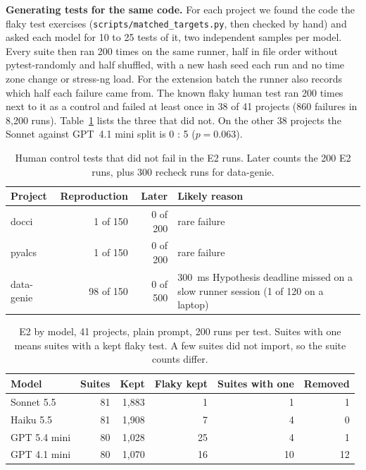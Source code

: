 \documentclass[sigconf,nonacm]{acmart}
\begin{document}
\textbf{Generating tests for the same code.} For each project we found the code the flaky test exercises (\texttt{scripts/matched\_targets.py}, then checked by hand) and asked each model for 10 to 25 tests of it, two independent samples per model. Every suite then ran 200 times on the same runner, half in file order without pytest-randomly and half shuffled, with a new hash seed each run and no time zone change or stress-ng load. For the extension batch the runner also records which half each failure came from. The known flaky human test ran 200 times next to it as a control and failed at least once in 38 of 41 projects (860 failures in 8,200 runs). Table~\ref{tab:control} lists the three that did not. On the other 38 projects the Sonnet against GPT~4.1 mini split is 0 : 5 ($p = 0.063$).

\begin{table}[h]
\caption{Human control tests that did not fail in the E2 runs. Later counts the 200 E2 runs, plus 300 recheck runs for data-genie.}
\label{tab:control}
\small
\setlength{\tabcolsep}{3pt}
\begin{tabularx}{\columnwidth}{lrrX}
\toprule
Project & Reproduction & Later & Likely reason \\
\midrule
docci & 1 of 150 & 0 of 200 & rare failure \\
pyalcs & 1 of 150 & 0 of 200 & rare failure \\
data-genie & 98 of 150 & 0 of 500 & 300~ms Hypothesis deadline missed on a slow runner session (1 of 120 on a laptop) \\
\bottomrule
\end{tabularx}
\end{table}

\begin{table}[h]
\caption{E2 by model, 41 projects, plain prompt, 200 runs per test. Suites with one means suites with a kept flaky test. A few suites did not import, so the suite counts differ.}
\label{tab:matched}
\small
\setlength{\tabcolsep}{4pt}
\begin{tabularx}{\columnwidth}{Xrrrrr}
\toprule
Model & Suites & Kept & Flaky kept & Suites with one & Removed \\
\midrule
Sonnet 5.5 & 81 & 1,883 & 1 & 1 & 1 \\
Haiku 5.5 & 81 & 1,908 & 7 & 4 & 0 \\
GPT 5.4 mini & 80 & 1,028 & 25 & 4 & 1 \\
GPT 4.1 mini & 80 & 1,070 & 16 & 10 & 12 \\
\bottomrule
\end{tabularx}
\end{table}
\end{document}
